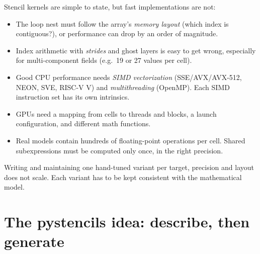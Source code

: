 Stencil kernels are simple to state, but fast implementations are not:
\begin{itemize}
  \item The loop nest must follow the array's \emph{memory layout} (which index is
        contiguous?), or performance can drop by an order of magnitude.
  \item Index arithmetic with \emph{strides} and ghost layers is easy to get wrong,
        especially for multi-component fields (e.g.\ 19 or 27 values per cell).
  \item Good CPU performance needs \emph{SIMD vectorization} (SSE/AVX/AVX-512, NEON,
        SVE, RISC-V V) and \emph{multithreading} (OpenMP). Each SIMD instruction set
        has its own intrinsics.
  \item GPUs need a mapping from cells to threads and blocks, a launch configuration,
        and different math functions.
  \item Real models contain hundreds of floating-point operations per cell. Shared
        subexpressions must be computed only once, in the right precision.
\end{itemize}
Writing and maintaining one hand-tuned variant per target, precision and layout does
not scale. Each variant has to be kept consistent with the mathematical model.

\section{The pystencils idea: describe, then generate}

